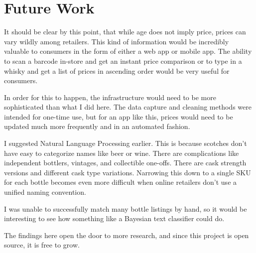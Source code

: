\chapter{Future Work}

It should be clear by this point, that while age does not imply price, prices can vary wildly among retailers. This kind of information would be incredibly valuable to consumers in the form of either a web app or mobile app. The ability to scan a barcode in-store and get an instant price comparison or to type in a whisky and get a list of prices in ascending order would be very useful for consumers.

In order for this to happen, the infrastructure would need to be more sophisticated than what I did here. The data capture and cleaning methods were intended for one-time use, but for an app like this, prices would need to be updated much more frequently and in an automated fashion. 

I suggested Natural Language Processing earlier. This is because scotches don't have easy to categorize names like beer or wine. There are complications like independent bottlers, vintages, and collectible one-offs. There are cask strength versions and different cask type variations. Narrowing this down to a single SKU for each bottle becomes even more difficult when online retailers don't use a unified naming convention. 

I was unable to successfully match many bottle listings by hand, so it would be interesting to see how something like a Bayesian text classifier could do.

The findings here open the door to more research, and since this project is open source, it is free to grow.